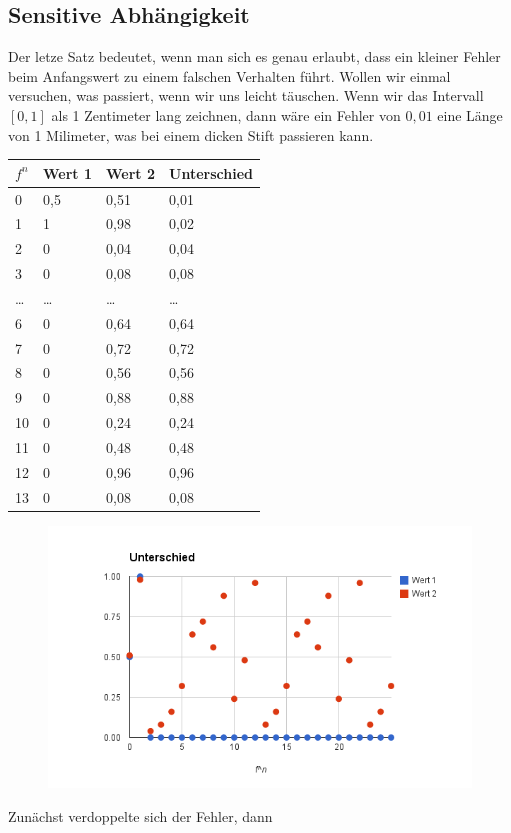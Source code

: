 \documentclass[a4paper,ngerman,12pt]{zirkelblatt1415}
\theoremstyle{definition}
\theoremstyle{remark}
\begin{document}
\subsection{Sensitive Abhängigkeit}
Der letze Satz bedeutet, wenn man sich es genau erlaubt, dass ein kleiner Fehler beim Anfangswert zu einem falschen Verhalten führt. Wollen wir einmal versuchen, was passiert, wenn wir uns leicht täuschen.
Wenn wir das Intervall $[0,1]$ als 1 Zentimeter lang zeichnen, dann wäre ein Fehler von $0,01$ eine Länge von 1 Milimeter, was bei einem dicken Stift passieren kann.
\begin{center}
\begin{tabular}{|l|l|l|l|}
\hline
$f^n$ & Wert 1 & Wert 2 & Unterschied \\ \hline
0 & 0,5 & 0,51  & 0,01 \\ \hline
1 & 1 & 0,98  & 0,02 \\ \hline
2 & 0 & 0,04  & 0,04 \\ \hline
3 & 0 & 0,08  & 0,08 \\ \hline
\ldots & \ldots & \ldots & \ldots \\ \hline
6 & 0 & 0,64  & 0,64 \\ \hline
7 & 0 & 0,72 & 0,72\\ \hline
8 & 0 & 0,56 & 0,56\\ \hline
9 & 0 & 0,88 & 0,88\\ \hline 
10 & 0 & 0,24 & 0,24\\ \hline
11 & 0 & 0,48 & 0,48\\ \hline
12 & 0 & 0,96 & 0,96\\ \hline
13 & 0 & 0,08 & 0,08\\ \hline
\end{tabular} 
\end{center}

\begin{figure}
\includegraphics[scale=0.5]{bilder/Unterschied}
\end{figure}

Zunächst verdoppelte sich der Fehler, dann  
\end{document}
